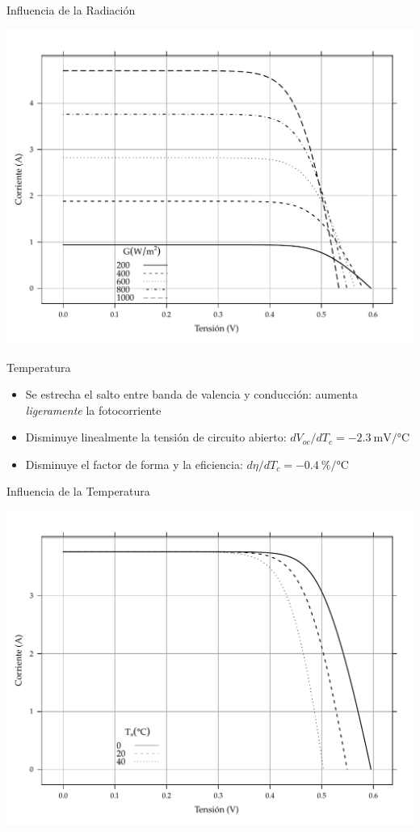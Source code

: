 \documentclass[xcolor={usenames,svgnames,dvipsnames}]{beamer}
\begin{document}
\begin{frame}[label={sec:org7ed3f6e}]{Influencia de la Radiación}
\begin{center}
\includegraphics[width=.9\linewidth]{../figs/CurvaIV_Ta20.pdf}
\end{center}
\end{frame}

\begin{frame}[label={sec:orgad1471e}]{Temperatura}
\begin{itemize}
\item Se estrecha el salto entre banda de valencia y conducción: aumenta \emph{ligeramente} la fotocorriente

\item \alert{Disminuye linealmente la tensión de circuito abierto}: \(dV_{oc}/dT_{c}=\SI{-2.3}{\milli\volt\per\celsius}\)

\item Disminuye el factor de forma y la eficiencia:
\(d\eta/dT_{c}=\SI{-0.4}{\percent\per\celsius}\)
\end{itemize}
\end{frame}

\begin{frame}[label={sec:org87cc18a}]{Influencia de la Temperatura}
\begin{center}
\includegraphics[width=.9\linewidth]{../figs/CurvaIV_G800.pdf}
\end{center}
\end{frame}
\end{document}
